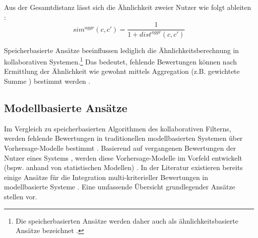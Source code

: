Aus der Gesamtdistanz lässt sich die Ähnlichkeit zweier Nutzer wie folgt ableiten \cite[S. 858]{adomavicius:4:inbook}:
\begin{equation}\label{eq21}
    sim^{aggr}(c,c') = \frac{1}{1 + dist^{aggr}(c,c')}
\end{equation}

Speicherbasierte Ansätze beeinflussen lediglich die Ähnlichkeitsberechnung in kollaborativen Systemen.\footnote{Die speicherbasierten Ansätze werden daher auch als ähnlichkeitsbasierte Ansätze bezeichnet \cite[S. 52]{adomavicius:inproceedings:2}.}
Das bedeutet, fehlende Bewertungen können nach Ermittlung der Ähnlichkeit wie gewohnt mittels Aggregation (z.B. gewichtete Summe \cite[S. 859]{adomavicius:4:inbook}) bestimmt werden \cite[S. 52]{adomavicius:inproceedings:2}\cite[S. 428]{recommenderSystems:2016}.

\subsection{Modellbasierte Ansätze}
Im Vergleich zu speicherbasierten Algorithmen des kollaborativen Filterns, werden fehlende Bewertungen in traditionellen modellbasierten Systemen über Vorhersage-Modelle bestimmt \cite[S. 861]{recommenderSystems:2016}.
Basierend auf vergangenen Bewertungen der Nutzer eines Systems \cite[S. 358]{jin:article}, werden diese Vorhersage-Modelle im Vorfeld entwickelt (bspw. anhand von statistischen Modellen) \cite[S. 71]{recommenderSystems:2016}.
In der Literatur existieren bereits einige Ansätze für die Integration multi-kriterieller Bewertungen in modellbasierte Systeme \cite[S. 861]{adomavicius:4:inbook}.
Eine umfassende Übersicht grundlegender Ansätze stellen \textcite[S. 861]{adomavicius:4:inbook} vor.

